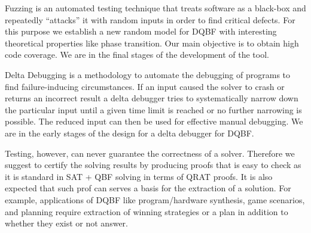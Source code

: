 \documentclass[conference]{IEEEtran}
\begin{document}
Fuzzing is an automated testing technique that treats software as a black-box and repeatedly “attacks” it with random inputs in order to find critical defects.
%
For this purpose we establish a new random model for DQBF with interesting theoretical properties like phase transition.
%
Our main objective is to obtain high code coverage.
%
%
We are in the final stages of the development of the tool. 

Delta Debugging is a methodology to automate the debugging of programs to find failure-inducing circumstances. 
%
If an input caused the solver to crash or returns an incorrect result a delta debugger tries to systematically narrow down the particular input until a given time limit is reached or no further narrowing is possible.
%
The reduced input can then be used for effective manual debugging.
%
We are in the early stages of the design for a delta debugger for DQBF.

Testing, however, can never guarantee the correctness of a solver.
%
Therefore we suggest to certify the solving results by producing proofs that is easy to check as it is standard in SAT + QBF solving in terms of QRAT proofs.
%
%
%
It is also expected that such prof can serves a basis for the extraction of a solution. 
% 
For example, applications of DQBF like program/hardware synthesis, game scenarios, and planning require extraction of winning strategies or a plan in addition to whether they exist or not answer.
%
%

\end{document}
